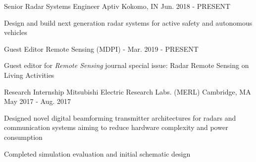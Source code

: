 
\begin{cventries}

  \cventry
    {Senior Radar Systems Engineer} %
    {Aptiv} %
    {Kokomo, IN} %
    {Jun. 2018 - PRESENT} %
    {
      \begin{cvitems} %
        \item {Design and build next generation radar systems for active safety and autonomous vehicles}
      \end{cvitems}
    }
    
  \cventry
    {Guest Editor} %
    {Remote Sensing (MDPI)} %
    {-} %
    {Mar. 2019 - PRESENT} %
    {
      \begin{cvitems} %
        \item {Guest editor for {\em{Remote Sensing}} journal special issue: Radar Remote Sensing on Living Activities}
      \end{cvitems}
    }

  \cventry
    {Research Internship} %
    {Mitsubishi Electric Research Labs. (MERL)} %
    {Cambridge, MA} %
    {May 2017 - Aug. 2017} %
    {
      \begin{cvitems} %
        \item {Designed novel digital beamforming transmitter architectures for radars and communication systems aiming to reduce hardware complexity and power consumption}
        \item {Completed simulation evaluation and initial schematic design}
      \end{cvitems}
    }

\end{cventries}
